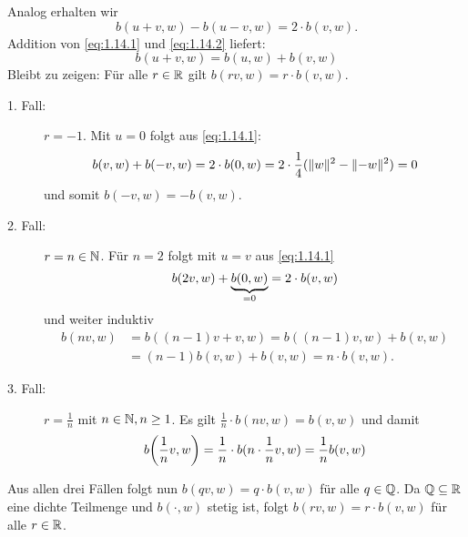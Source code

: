 \begin{beweis}
\begin{description}
\begin{itemize}
			Analog erhalten wir
			\begin{equation}
				b(u+v,w) - b(u-v,w) = 2 \cdot b(v,w). \label{eq:1.14.2}
			\end{equation}
			Addition von \eqref{eq:1.14.1} und \eqref{eq:1.14.2} liefert:
			\[ b(u+v,w) = b(u,w) + b(v,w) \]
			Bleibt zu zeigen: Für alle $r \in \mathbb{R}$ gilt $b(rv,w) = r\cdot b(v,w)$.
			\begin{description}
				\item[1. Fall:] $r=-1$.
				Mit $u = 0$ folgt aus \eqref{eq:1.14.1}:
				\[
					b(v,w) + b(-v,w) = 2 \cdot b(0,w) = 2 \cdot \frac{1}{4} (\lVert w\rVert^2 - \lVert-w\rVert^2) = 0
				\]
				und somit $b(-v,w) = -b(v,w)$.
				\item[2. Fall:] $r = n \in \mathbb{N}$.
				Für $n = 2$ folgt mit $u = v$ aus \eqref{eq:1.14.1}
				\[
					b(2v,w) + {\underbrace{b(0,w)}_{=0}} = 2 \cdot b(v,w)
				\]
				und weiter induktiv
				\begin{align*}
					b(nv,w) &= b((n-1)v + v,w) = b((n-1)v,w) + b(v,w) \\
					&= (n-1) b(v,w) + b(v,w) = n\cdot b(v,w).
				\end{align*}
				\item[3. Fall:] $r = \frac{1}{n}$ mit $n \in \mathbb{N}, n \geq 1$.
				Es gilt $\frac{1}{n} \cdot b(nv,w) = b(v,w)$ und damit
				\[
					b\enbrace*{\frac{1}{n} v,w} = \frac{1}{n} \cdot b(n \cdot \frac{1}{n}v,w) = \frac{1}{n} b(v,w)
				\] 
			\end{description}
			Aus allen drei Fällen folgt nun $b(qv,w) = q\cdot b(v,w)$ für alle $q \in \mathbb{Q}$. Da $\mathbb{Q} \subseteq \mathbb{R}$ eine dichte Teilmenge und $b(\cdot,w)$ stetig ist, folgt $b(rv,w) = r \cdot b(v,w)$ für alle $r \in \mathbb{R}$. \qedhere
		\end{itemize}
	\end{description}
\end{beweis}


